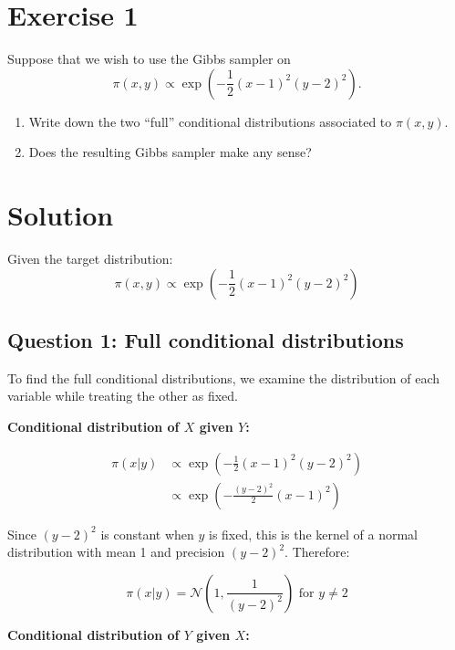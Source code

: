 \section*{Exercise 1}
Suppose that we wish to use the Gibbs sampler on
\begin{equation*}
\pi (x, y) \propto \exp \left(-\frac{1}{2}(x - 1)^2(y - 2)^2\right).
\end{equation*}

\begin{enumerate}
\item Write down the two ``full'' conditional distributions associated to $\pi (x, y)$.
\item Does the resulting Gibbs sampler make any sense?
\end{enumerate}

\section*{Solution}

Given the target distribution:
\begin{equation*}
\pi (x, y) \propto \exp \left(-\frac{1}{2}(x - 1)^2(y - 2)^2\right)
\end{equation*}

\subsection*{Question 1: Full conditional distributions}

To find the full conditional distributions, we examine the distribution of each variable while treating the other as fixed.

\textbf{Conditional distribution of $X$ given $Y$:}

\begin{align*}
\pi(x|y) &\propto \exp \left(-\frac{1}{2}(x - 1)^2(y - 2)^2\right)\\
&\propto \exp \left(-\frac{(y - 2)^2}{2}(x - 1)^2\right)
\end{align*}

Since $(y-2)^2$ is constant when $y$ is fixed, this is the kernel of a normal distribution with mean 1 and precision $(y-2)^2$. Therefore:

\begin{equation*}
\pi(x|y) = \mathcal{N}\left(1, \frac{1}{(y-2)^2}\right) \text{ for } y \neq 2
\end{equation*}

\textbf{Conditional distribution of $Y$ given $X$:}

